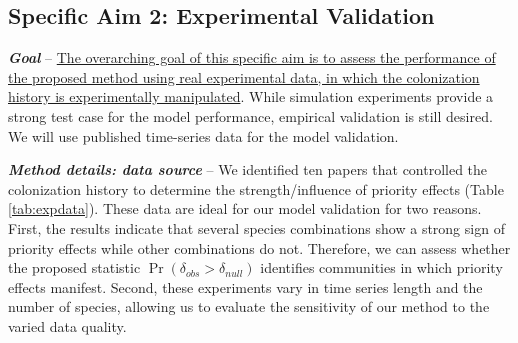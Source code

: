 \documentclass[12pt, class=article, crop=false]{standalone}
\begin{document}




\subsection*{Specific Aim 2: Experimental Validation}

\textbf{\textit{Goal}} -- 
\ul{The overarching goal of this specific aim is to assess the performance of the proposed method using real experimental data, in which the colonization history is experimentally manipulated}.
While simulation experiments provide a strong test case for the model performance, empirical validation is still desired.
We will use published time-series data for the model validation.

\textit{\textbf{Method details: data source}} --
We identified ten papers that controlled the colonization history to determine the strength/influence of priority effects (Table \ref{tab:expdata}).
These data are ideal for our model validation for two reasons. First, the results indicate that several species combinations show a strong sign of priority effects while other combinations do not.
Therefore, we can assess whether the proposed statistic $\Pr(\delta_{obs} > \delta_{null})$ identifies communities in which priority effects manifest.
Second, these experiments vary in time series length and the number of species, allowing us to evaluate the sensitivity of our method to the varied data quality.
\end{document}
